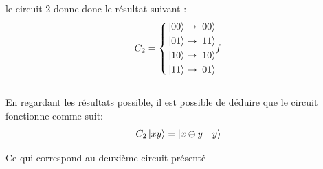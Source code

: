 \documentclass{article}
\begin{document}
le circuit 2 donne donc le résultat suivant :
\[
C_2 = 
    \left\{
        \begin{aligned}
            &\ket{00} \mapsto \ket{00}\\
            &\ket{01} \mapsto \ket{11}\\
            &\ket{10} \mapsto \ket{10}\\
            &\ket{11} \mapsto \ket{01}\\
        \end{aligned}f
    \right .
\] \\

En regardant les résultats possible, il est possible de déduire que le circuit fonctionne comme suit:\\
\[C_2\ket{xy} = \ket{x \oplus y \quad y}\]

Ce qui correspond au deuxième circuit présenté
\end{document}

